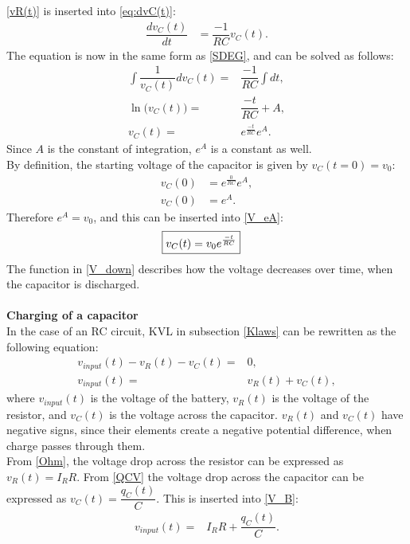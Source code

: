 \eqref{vR(t)} is inserted into \eqref{eq:dvC(t)}:
\begin{align*}
	\dfrac{dv_C(t)}{dt} &= \dfrac{-1}{RC}v_C(t).
\end{align*}
The equation is now in the same form as \eqref{SDEG}, and can be solved as follows:
\begin{align}
\int \dfrac{1}{v_C(t)}dv_C(t) =& \dfrac{-1}{RC} \int dt, \nonumber \\
\ln\big(v_C(t)\big) =& \dfrac{-t}{RC} + A, \nonumber\\
v_C(t) =& e^{\frac{-t}{RC}}e^{A}.\label{V_eA}
\end{align}
Since $A$ is the constant of integration, $e^A$ is a constant as well.
\\
By definition, the starting voltage of the capacitor is given by $v_C(t=0)=v_0$:
 \begin{align*}
	v_C(0) &= e^{\frac{0}{RC}}e^A, \\
	v_C(0) &= e^A.
 \end{align*}
Therefore $e^A = v_0$, and this can be inserted into \eqref{V_eA}:
\begin{align}
\label{V_down}
\Aboxed{
 v_C(t) = v_0e^{\frac{-t}{RC}}
 }
\end{align}
The function in \eqref{V_down} describes how the voltage decreases over time, when the capacitor is discharged.
\\
\\
\textbf{Charging of a capacitor}\\
In the case of an RC circuit, KVL in subsection \ref{Klaws} can be rewritten as the following equation:
\begin{align}
v_{input}(t)-v_R(t)-v_C(t) =& 0, \nonumber \\
v_{input}(t) =& v_R(t)+v_C(t), \label{V_B}
\end{align}
where $v_{input}(t)$ is the voltage of the battery, $v_R(t)$ is the voltage of the resistor, and $v_C(t)$ is the voltage across the capacitor. $v_R(t)$ and $v_C(t)$ have negative signs, since their elements create a negative potential difference, when charge passes through them.
\\
From \eqref{Ohm}, the voltage drop across the resistor can be expressed as $v_R(t)=I_R R$. From \eqref{QCV} the voltage drop across the capacitor can be expressed as $v_C(t)=\dfrac{q_C (t)}{C}$. This is inserted into \eqref{V_B}:
\begin{align}
v_{input}(t) =& I_R R + \dfrac{q_C (t)}{C}. \label{Vb=IR}
\end{align}
